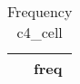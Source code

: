 \begin{table}[htbp]\centering
\def\sym#1{\ifmmode^{#1}\else\(^{#1}\)\fi}
\caption{Frequency c4\_cell \label{tab:"label"}}
\begin{tabular*}{0.9\hsize}{@{\hskip\tabcolsep\extracolsep\fill}l*{1}{c}}
\toprule
                                &     freq\\
\midrule
\bottomrule
\end{tabular*}
\end{table}
